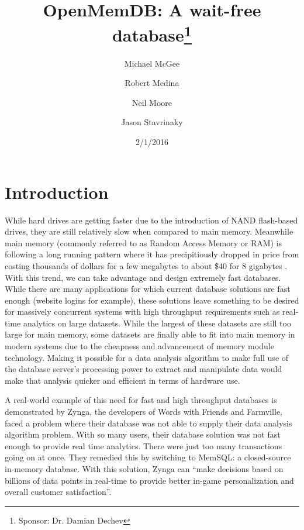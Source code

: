 \documentclass[letter,11pt]{article}
\title{OpenMemDB: A wait-free database\thanks{Sponsor: Dr. Damian Dechev}}
\author{Michael McGee \and Robert Medina \and Neil Moore \and Jason Stavrinaky}
\date{2/1/2016}
\begin{document}
\maketitle
\newpage


\section{Introduction}
While hard drives are getting faster due to the introduction of NAND flash-based drives,
they are still relatively slow when compared to main memory. Meanwhile main memory (commonly 
referred to as Random Access Memory or RAM) is following a long running 
pattern where it has precipitiously dropped in price from costing thousands of dollars for a few 
megabytes to about \$40 for 8 gigabytes \cite{jcmit}. With this trend, we can take 
advantage and design extremely fast databases. While there are many applications for 
which current database solutions are fast enough (website logins for example), these 
solutions leave something to be desired for massively concurrent systems with high throughput
requirements such as real-time analytics on large datasets. While the largest of 
these datasets are still too large for main memory, some datasets are finally able
to fit into main memory in modern systems due to the cheapness and advancement of 
memory module technology. Making it possible for a data analysis algorithm to make 
full use of the database server's processing power to extract and manipulate data
would make that analysis quicker and efficient in terms of hardware use.
\par\vspace{\baselineskip}
A real-world example of this need for fast and high throughput databases is demonstrated by Zynga, 
the developers of Words with Friends and Farmville, faced a problem where their 
database was not able to supply their data analysis algorithm problem. With so 
many users, their database solution was not fast enough to provide real time analytics. 
There were just too many transactions going on at once. They 
remedied this by switching to MemSQL: a closed-source in-memory database. With this 
solution, Zynga can ``make decisions based on billions of data points in real-time to 
provide better in-game personalization and overall customer satisfaction''. \cite{MemSQL} 
\end{document}
